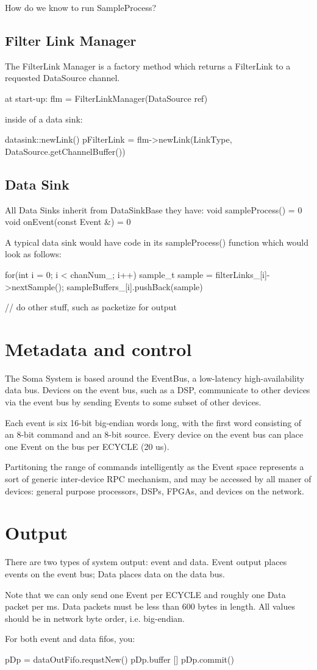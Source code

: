 How do we know to run SampleProcess? 

\subsection{Filter Link Manager}
The FilterLink Manager is a factory method which returns a FilterLink to a requested DataSource channel. 

at start-up:
  flm = FilterLinkManager(DataSource ref) 
  
inside of a data sink: 

datasink::newLink()
   pFilterLink = flm->newLink(LinkType, DataSource.getChannelBuffer())


\subsection{Data Sink}
All Data Sinks inherit from DataSinkBase
they have: 
  void sampleProcess() = 0 
  void onEvent(const Event &) = 0


A typical data sink would have code in its sampleProcess() function
which would look as follows:

for(int i = 0; i < chanNum_; i++) {
   sample_t sample = filterLinks_[i]->nextSample(); 
   sampleBuffers_[i].pushBack(sample)
}

// do other stuff, such as packetize for output


\section{Metadata and control}
The Soma System is based around the EventBus, a low-latency
high-availability data bus. Devices on the event bus, such as a DSP,
communicate to other devices via the event bus by sending Events to
some subset of other devices.

Each event is six 16-bit big-endian words long, with the first word
consisting of an 8-bit command and an 8-bit source. Every device on
the event bus can place one Event on the bus per ECYCLE (20 us).

Partitoning the range of commands intelligently as the Event space
represents a sort of generic inter-device RPC mechanism, and may be
accessed by all maner of devices: general purpose processors, DSPs,
FPGAs, and devices on the network.


\section{Output} 
There are two types of system output: event and data. Event output
places events on the event bus; Data places data on the data bus.

Note that we can only send one Event per ECYCLE and roughly one Data
packet per ms. Data packets must be less than 600 bytes in length. All
values should be in network byte order, i.e. big-endian. 

For both event and data fifos, you: 

pDp = dataOutFifo.requstNew()
pDp.buffer []
pDp.commit()
